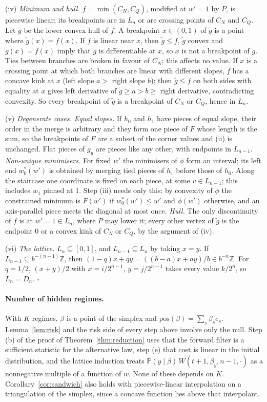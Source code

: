\documentclass{article}
\theoremstyle{plain}
\theoremstyle{definition}
\theoremstyle{remark}
\newcommand{\PP}{\mathbb{P}}
\newcommand{\pos}{\mathrm{pos}}
\begin{document}
(iv) \emph{Minimum and hull.} $f=\min(C_N,C_Q)$, modified at $w'=1$ by $P$, is piecewise linear; its breakpoints are in $L_n$ or are crossing points of $C_N$ and $C_Q$. Let $\tilde g$ be the lower convex hull of $f$. A breakpoint $x\in(0,1)$ of $\tilde g$ is a point where $\tilde g(x)=f(x)$. If $f$ is linear near $x$, then $\tilde g\le f$, $\tilde g$ convex and $\tilde g(x)=f(x)$ imply that $\tilde g$ is differentiable at $x$, so $x$ is not a breakpoint of $\tilde g$. Ties between branches are broken in favour of $C_N$; this affects no value. If $x$ is a crossing point at which both branches are linear with different slopes, $f$ has a concave kink at $x$ (left slope $a>$ right slope $b$); then $\tilde g\le f$ on both sides with equality at $x$ gives left derivative of $\tilde g\ge a>b\ge$ right derivative, contradicting convexity. So every breakpoint of $\tilde g$ is a breakpoint of $C_N$ or $C_Q$, hence in $L_n$.

(v) \emph{Degenerate cases.} \emph{Equal slopes.} If $h_0$ and $h_1$ have pieces of equal slope, their order in the merge is arbitrary and they form one piece of $F$ whose length is the sum, so the breakpoints of $F$ are a subset of the corner values and (ii) is unchanged. Flat pieces of $g_y$ are pieces like any other, with endpoints in $L_{n-1}$. \emph{Non-unique minimisers.} For fixed $w'$ the minimisers of $\phi$ form an interval; its left end $w_0^*(w')$ is obtained by merging tied pieces of $h_1$ before those of $h_0$. Along the staircase one coordinate is fixed on each piece, at some $v\in L_{n-1}$; this includes $w_1$ pinned at 1. Step (iii) needs only this: by convexity of $\phi$ the constrained minimum is $F(w')$ if $w_0^*(w')\le w'$ and $\phi(w')$ otherwise, and an axis-parallel piece meets the diagonal at most once. \emph{Hull.} The only discontinuity of $f$ is at $w'=1\in L_n$, where $P$ may lower it; every other vertex of $\tilde g$ is the endpoint 0 or a convex kink of $C_N$ or $C_Q$, by the argument of (iv).

(vi) \emph{The lattice.} $L_n\subseteq[0,1]$, and $L_{n-1}\subseteq L_n$ by taking $x=y$. If $L_{n-1}\subseteq b^{-(n-1)}\mathbb{Z}$, then $(1-q)x+qy=((b-a)x+ay)/b\in b^{-n}\mathbb{Z}$. For $q=1/2$, $(x+y)/2$ with $x=i/2^{n-1}$, $y=j/2^{n-1}$ takes every value $k/2^n$, so $L_n=D_n$. \hfill$\square$

\paragraph{Number of hidden regimes.}
\label{app:kstate}
With $K$ regimes, $\beta$ is a point of the simplex and $\pos(\beta)=\sum_s\beta_se_s$. Lemma~\ref{lem:risk} and the risk side of every step above involve only the null. Step (b) of the proof of Theorem~\ref{thm:reduction} uses that the forward filter is a sufficient statistic for the alternative law, step (e) that cost is linear in the initial distribution, and the lattice induction treats $\PP(y\mid\beta)\,W(t+1,\beta_y,n-1,\cdot)$ as a nonnegative multiple of a function of $w$. None of these depends on $K$. Corollary~\ref{cor:sandwich} also holds with piecewise-linear interpolation on a triangulation of the simplex, since a concave function lies above that interpolant.
\end{document}
